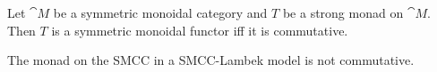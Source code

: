 \begin{lemma}
  Let $\cat{M}$ be a symmetric monoidal category and $T$ be a strong monad on $\cat{M}$. Then
  $T$ is a symmetric monoidal functor iff it is commutative.
\end{lemma}

\begin{theorem}
  The monad on the SMCC in a SMCC-Lambek model is not commutative.
\end{theorem}

























